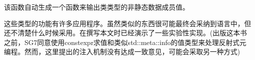 该函数自动生成一个函数来输出类类型的非静态数据成员值。

这些类型的功能有许多应用程序。虽然类似的东西很可能最终会采纳到语言中，但还不清楚什么时候采用。在撰写本文时已经演示了一些实验性实现。(出版这本书之前，SG7同意使用constexpr求值和类似std::meta::info的值类型来处理反射式元编程。然而，这里提出的注入机制没有达成一致意见，可能会采取另一种方式)

























